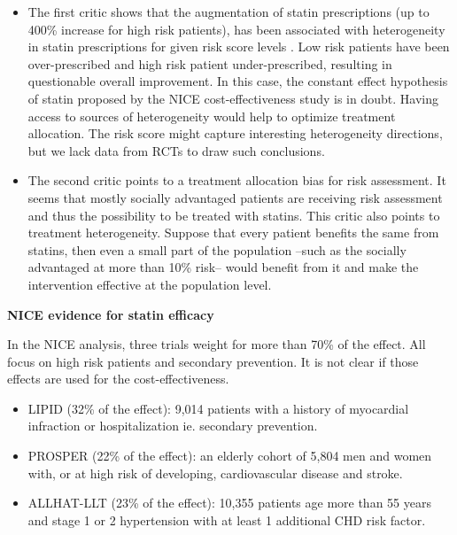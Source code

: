\documentclass[10pt,letterpaper]{article}
\begin{document}
\begin{itemize}
  \item The first critic shows that the augmentation of statin prescriptions
        (up to 400\% increase for high risk patients), has been associated with
        heterogeneity in statin prescriptions for given risk score levels
        \cite{van2013efficiency}. Low risk patients have been over-prescribed
        and high risk patient under-prescribed, resulting in questionable overall
        improvement. In this case, the constant effect
        hypothesis of statin proposed by the NICE cost-effectiveness study is in doubt.
        Having access to sources of heterogeneity would help to optimize
        treatment allocation. The risk score might capture interesting
        heterogeneity directions, but we lack data from RCTs to draw such conclusions.

  \item  The second critic points to a treatment allocation bias for risk
        assessment. It seems that mostly socially advantaged patients are
        receiving risk assessment and thus the possibility to be treated with
        statins. This critic also points to treatment heterogeneity.
        Suppose that every patient benefits the same from statins, then even a
        small part of the population --such as the socially advantaged at more
        than 10\% risk-- would benefit from it and make the intervention
        effective at the population level.
\end{itemize}



\textbf{NICE evidence for statin efficacy}

In the NICE analysis, three trials weight for more than 70\% of the effect. All
focus on high risk patients and secondary prevention. It is not clear if
those effects are used for the cost-effectiveness.

\begin{itemize}
  \item LIPID \cite{long1998prevention} (32\% of the effect): 9,014 patients with a history of
        myocardial infraction or hospitalization ie. secondary prevention.
  \item PROSPER \cite{shepherd2002pravastatin} (22\% of the effect): an elderly cohort of
        5,804 men and women with, or at high risk of developing, cardiovascular
        disease and stroke.
  \item ALLHAT-LLT \cite{antihypertensive2002major} (23\% of the effect): 10,355 patients age more than 55
        years and stage 1 or 2 hypertension with at least 1 additional CHD risk
        factor.
\end{itemize}
\clearpage
\end{document}

